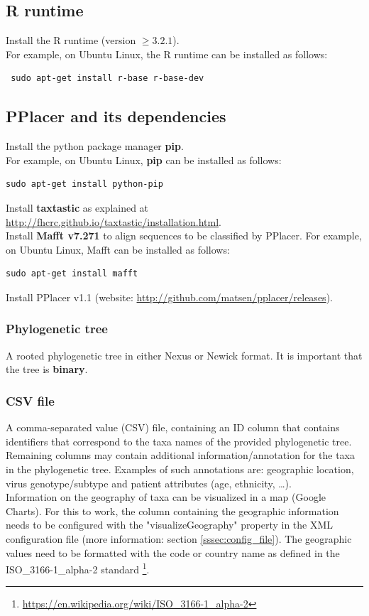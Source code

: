 \documentclass[a4paper, 11pt]{article} %
\begin{document}
\subsection*{R runtime}
Install the R runtime (version $\geq 3.2.1$).\\

\noindent For example, on Ubuntu Linux, the R runtime can be installed as follows:
\begin{verbatim}
 sudo apt-get install r-base r-base-dev
\end{verbatim}

\subsection*{PPlacer and its dependencies}
 Install the python package manager \textbf{pip}. \\

\noindent For example, on Ubuntu Linux, \textbf{pip} can be installed as follows:
\begin{verbatim}
sudo apt-get install python-pip
\end{verbatim}

\noindent Install \textbf{taxtastic} as explained at \url{http://fhcrc.github.io/taxtastic/installation.html}.\\

\noindent Install \textbf{Mafft v7.271} to align sequences to be classified by PPlacer. 
For example, on Ubuntu Linux, Mafft can be installed as follows:
\begin{verbatim}
sudo apt-get install mafft
\end{verbatim}

\noindent Install PPlacer v1.1 (website: \url{http://github.com/matsen/pplacer/releases}).

\subsubsection*{Phylogenetic tree}
A rooted phylogenetic tree in either Nexus or Newick format. It is important that the tree is \textbf{binary}.

\subsubsection*{CSV file}
A comma-separated value (CSV) file, containing an ID column that contains identifiers that correspond to the taxa names of the provided phylogenetic tree.
Remaining columns may contain additional information/annotation for the taxa in the phylogenetic tree. 
Examples of such annotations are: geographic location, virus genotype/subtype and patient attributes (age, ethnicity, \ldots). \\
Information on the geography of taxa can be visualized in a map (Google Charts). 
For this to work, the column containing the geographic information needs to be configured with the "visualizeGeography" property in the XML configuration file (more information: section \ref{sssec:config_file}). 
The geographic values need to be formatted with the code or country name as defined in the ISO\_3166-1\_alpha-2 standard \footnote{\url{https://en.wikipedia.org/wiki/ISO\_3166-1\_alpha-2}}.
\end{document}
